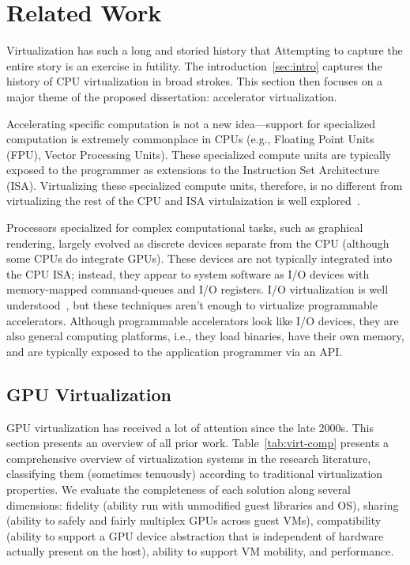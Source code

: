 \chapter{Related Work}
\label{Chapter:related}

Virtualization has such a long and storied history that Attempting to capture
the entire story is an exercise in futility. The introduction~\ref{sec:intro}
captures the history of CPU virtualization in broad strokes. This section then
focuses on a major theme of the proposed dissertation:
accelerator virtualization.

Accelerating specific computation is not a new idea---support for specialized
computation is extremely commonplace in CPUs (e.g., Floating Point Units
(FPU), Vector Processing Units). These specialized compute units are
typically exposed to the programmer as extensions to the Instruction Set
Architecture (ISA). Virtualizing these specialized compute units, therefore,
is no different from virtualizing the rest of the CPU and ISA virtulaization
is well explored~\cite{cp40,vm370,popek-goldberg,bugnion-disco,
bugnion-nieh-tsafrir,bugnion-workstation}.

Processors specialized for complex computational tasks, such as graphical
rendering, largely evolved as discrete devices separate from the CPU (although
some CPUs do integrate GPUs). These devices are not typically integrated into
the CPU ISA; instead, they appear to system software as I/O devices with
memory-mapped command-queues and I/O registers. I/O virtualization is well
understood~\cite{waldspurger12cacm,paradice,Kuperman_undated-io,Sig2010-ml,
zeng2013improved,abramson2006intel}, but these techniques aren't enough to
virtualize programmable accelerators. Although programmable accelerators look
like I/O devices, they are also general computing platforms, i.e., they load
binaries, have their own memory, and are typically exposed to the application
programmer via an API.

\section{GPU Virtualization}
GPU virtualization has received a lot of attention since the late 2000s. This
section presents an overview of all prior work.
Table~\ref{tab:virt-comp} presents a comprehensive overview of virtualization
systems in the research literature, classifying them (sometimes tenuously)
according to traditional virtualization properties.
We evaluate the completeness of each solution along several dimensions:
fidelity (ability run with unmodified guest libraries and OS), sharing (ability to safely and fairly multiplex GPUs across guest VMs), compatibility (ability to support a GPU device abstraction that is independent of hardware actually present on the host), ability to support VM mobility, and performance.


